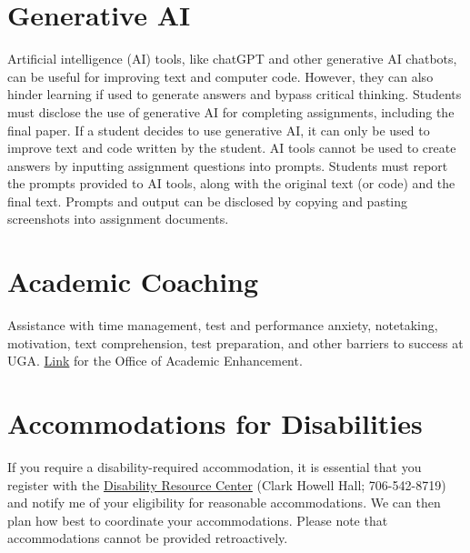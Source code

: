\documentclass[12pt]{article}
\begin{document}
\section*{\normalsize Generative AI}

Artificial intelligence (AI) tools, like chatGPT and other generative AI
chatbots, can be useful for improving text and computer code. However,
they can also hinder learning if used to generate answers and bypass
critical thinking. Students must disclose the use of generative AI for
completing assignments, including the final paper. If a
student decides to use generative AI, it can only be used to improve
text and code written by the student. AI tools cannot be used to create
answers by inputting assignment questions into prompts. Students
must report the prompts provided to AI tools, along with the original
text (or code) and the final text. Prompts and output can be disclosed
by copying and pasting screenshots into assignment documents. 



\section*{\normalsize Academic Coaching}

Assistance with time management, test and performance anxiety,
notetaking, motivation, text comprehension, test preparation, and
other barriers to success at
UGA. \href{https://dae.uga.edu/services/academic-coaching/}{\color{blue}
  Link} for the Office of Academic Enhancement. 

\section*{\normalsize Accommodations for Disabilities}

If you require a disability-required accommodation, it is essential
that you register with the \href{https://drc.uga.edu}{Disability Resource Center} (Clark Howell
Hall; 706-542-8719)
and notify me of your eligibility for reasonable accommodations. We
can then plan how best to coordinate your accommodations. Please note
that accommodations cannot be provided retroactively.
\end{document}
